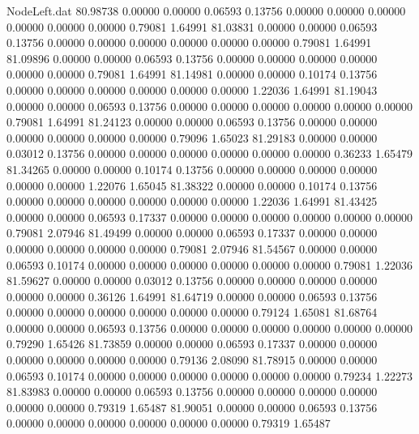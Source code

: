 \begin{filecontents}{NodeLeft.dat}
  80.98738    0.00000    0.00000     0.06593    0.13756    0.00000    0.00000    0.00000    0.00000    0.00000    0.00000    0.79081    1.64991
  81.03831    0.00000    0.00000     0.06593    0.13756    0.00000    0.00000    0.00000    0.00000    0.00000    0.00000    0.79081    1.64991
  81.09896    0.00000    0.00000     0.06593    0.13756    0.00000    0.00000    0.00000    0.00000    0.00000    0.00000    0.79081    1.64991
  81.14981    0.00000    0.00000     0.10174    0.13756    0.00000    0.00000    0.00000    0.00000    0.00000    0.00000    1.22036    1.64991
  81.19043    0.00000    0.00000     0.06593    0.13756    0.00000    0.00000    0.00000    0.00000    0.00000    0.00000    0.79081    1.64991
  81.24123    0.00000    0.00000     0.06593    0.13756    0.00000    0.00000    0.00000    0.00000    0.00000    0.00000    0.79096    1.65023
  81.29183    0.00000    0.00000     0.03012    0.13756    0.00000    0.00000    0.00000    0.00000    0.00000    0.00000    0.36233    1.65479
  81.34265    0.00000    0.00000     0.10174    0.13756    0.00000    0.00000    0.00000    0.00000    0.00000    0.00000    1.22076    1.65045
  81.38322    0.00000    0.00000     0.10174    0.13756    0.00000    0.00000    0.00000    0.00000    0.00000    0.00000    1.22036    1.64991
  81.43425    0.00000    0.00000     0.06593    0.17337    0.00000    0.00000    0.00000    0.00000    0.00000    0.00000    0.79081    2.07946
  81.49499    0.00000    0.00000     0.06593    0.17337    0.00000    0.00000    0.00000    0.00000    0.00000    0.00000    0.79081    2.07946
  81.54567    0.00000    0.00000     0.06593    0.10174    0.00000    0.00000    0.00000    0.00000    0.00000    0.00000    0.79081    1.22036
  81.59627    0.00000    0.00000     0.03012    0.13756    0.00000    0.00000    0.00000    0.00000    0.00000    0.00000    0.36126    1.64991
  81.64719    0.00000    0.00000     0.06593    0.13756    0.00000    0.00000    0.00000    0.00000    0.00000    0.00000    0.79124    1.65081
  81.68764    0.00000    0.00000     0.06593    0.13756    0.00000    0.00000    0.00000    0.00000    0.00000    0.00000    0.79290    1.65426
  81.73859    0.00000    0.00000     0.06593    0.17337    0.00000    0.00000    0.00000    0.00000    0.00000    0.00000    0.79136    2.08090
  81.78915    0.00000    0.00000     0.06593    0.10174    0.00000    0.00000    0.00000    0.00000    0.00000    0.00000    0.79234    1.22273
  81.83983    0.00000    0.00000     0.06593    0.13756    0.00000    0.00000    0.00000    0.00000    0.00000    0.00000    0.79319    1.65487
  81.90051    0.00000    0.00000     0.06593    0.13756    0.00000    0.00000    0.00000    0.00000    0.00000    0.00000    0.79319    1.65487

\end{filecontents}
